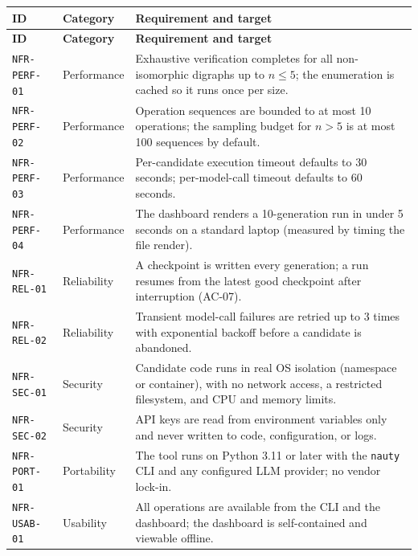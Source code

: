 \documentclass[12pt,a4paper]{article}
\begin{document}
\begin{center}
\footnotesize
\setlength{\tabcolsep}{4pt}
\renewcommand{\arraystretch}{1.2}
\begin{longtable}{@{}p{2.4cm}p{2.0cm}p{8.4cm}@{}}
\toprule
\textbf{ID} & \textbf{Category} & \textbf{Requirement and target} \\
\midrule
\endfirsthead
\toprule
\textbf{ID} & \textbf{Category} & \textbf{Requirement and target} \\
\midrule
\endhead
\bottomrule
\endfoot

\texttt{NFR-PERF-01} & Performance & Exhaustive verification completes for all non-isomorphic digraphs up to $n \le 5$; the enumeration is cached so it runs once per size. \\
\addlinespace[2pt]
\texttt{NFR-PERF-02} & Performance & Operation sequences are bounded to at most 10 operations; the sampling budget for $n > 5$ is at most 100 sequences by default. \\
\addlinespace[2pt]
\texttt{NFR-PERF-03} & Performance & Per-candidate execution timeout defaults to 30 seconds; per-model-call timeout defaults to 60 seconds. \\
\addlinespace[2pt]
\texttt{NFR-PERF-04} & Performance & The dashboard renders a 10-generation run in under 5 seconds on a standard laptop (measured by timing the file render). \\
\addlinespace[2pt]
\texttt{NFR-REL-01} & Reliability & A checkpoint is written every generation; a run resumes from the latest good checkpoint after interruption (AC-07). \\
\addlinespace[2pt]
\texttt{NFR-REL-02} & Reliability & Transient model-call failures are retried up to 3 times with exponential backoff before a candidate is abandoned. \\
\addlinespace[2pt]
\texttt{NFR-SEC-01} & Security & Candidate code runs in real OS isolation (namespace or container), with no network access, a restricted filesystem, and CPU and memory limits. \\
\addlinespace[2pt]
\texttt{NFR-SEC-02} & Security & API keys are read from environment variables only and never written to code, configuration, or logs. \\
\addlinespace[2pt]
\texttt{NFR-PORT-01} & Portability & The tool runs on Python 3.11 or later with the \texttt{nauty} CLI and any configured LLM provider; no vendor lock-in. \\
\addlinespace[2pt]
\texttt{NFR-USAB-01} & Usability & All operations are available from the CLI and the dashboard; the dashboard is self-contained and viewable offline. \\

\end{longtable}
\end{center}
\end{document}
